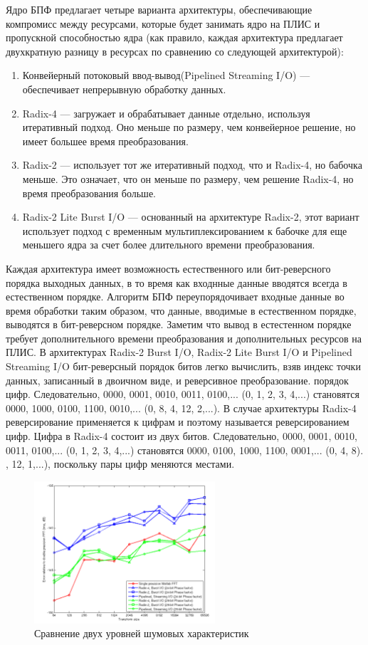 Ядро БПФ предлагает четыре варианта архитектуры, обеспечивающие компромисс между ресурсами, которые будет занимать ядро на ПЛИС и пропускной способностью ядра (как правило, каждая архитектура предлагает двухкратную разницу в ресурсах по сравнению со следующей архитектурой): 
\begin{enumerate}
	\item Конвейерный потоковый ввод-вывод(Pipelined Streaming I/O) — обеспечивает непрерывную обработку данных. 
	\item Radix-4 — загружает и обрабатывает данные отдельно, используя итеративный подход. Оно меньше по размеру, чем конвейерное решение, но имеет большее время преобразования. 
	\item Radix-2 — использует тот же итеративный подход, что и Radix-4, но бабочка меньше. Это означает, что он меньше по размеру, чем решение Radix-4, но время преобразования больше. 
	\item Radix-2 Lite Burst I/O — основанный на архитектуре Radix-2, этот вариант использует подход с временным мультиплексированием к бабочке для еще меньшего ядра за счет более длительного времени преобразования.
\end{enumerate} 

Каждая архитектура имеет возможность естественного или бит-реверсного порядка выходных данных, в то время как входнные данные вводятся всегда в естественном порядке. Алгоритм БПФ переупорядочивает входные данные во время обработки таким образом, что данные, вводимые в естественном порядке, выводятся в бит-реверсном порядке. Заметим что вывод в естестенном порядке требует дополнительного времени преобразования и дополнительных ресурсов на ПЛИС. В архитектурах Radix-2 Burst I/O, Radix-2 Lite Burst I/O и Pipelined Streaming I/O бит-реверсный порядок битов легко вычислить, взяв индекс точки данных, записанный в двоичном виде, и реверсивное преобразование. порядок цифр. Следовательно, 0000, 0001, 0010, 0011, 0100,... (0, 1, 2, 3, 4,...) становятся 0000, 1000, 0100, 1100, 0010,... (0, 8, 4, 12, 2,...). В случае архитектуры Radix-4 реверсирование применяется к цифрам и поэтому называется реверсированием цифр. Цифра в Radix-4 состоит из двух битов. Следовательно, 0000, 0001, 0010, 0011, 0100,... (0, 1, 2, 3, 4,...) становятся 0000, 0100, 1000, 1100, 0001,... (0, 4, 8). , 12, 1,...), поскольку пары цифр меняются местами. 

\begin{figure}[h]
	\centering
	\includegraphics[width=0.6\textwidth]{image/fft_xilinx_fp.png}
	\caption{Сравнение двух уровней шумовых характеристик}
	\label{fft_xilinx_fp}
\end{figure}


